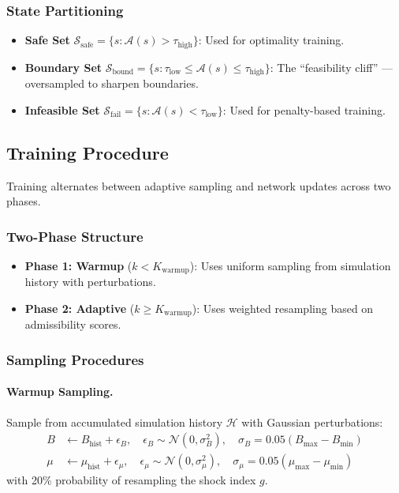 \subsubsection{State Partitioning}
\begin{itemize}
    \item \textbf{Safe Set} $\mathcal{S}_{\text{safe}} = \{s : \mathcal{A}(s) > \tau_{\text{high}}\}$: Used for optimality training.
    \item \textbf{Boundary Set} $\mathcal{S}_{\text{bound}} = \{s : \tau_{\text{low}} \leq \mathcal{A}(s) \leq \tau_{\text{high}}\}$: The ``feasibility cliff'' --- oversampled to sharpen boundaries.
    \item \textbf{Infeasible Set} $\mathcal{S}_{\text{fail}} = \{s : \mathcal{A}(s) < \tau_{\text{low}}\}$: Used for penalty-based training.
\end{itemize}


\subsection{Training Procedure}\label{sec:training}

Training alternates between adaptive sampling and network updates across two phases.

\subsubsection{Two-Phase Structure}
\begin{itemize}
    \item \textbf{Phase 1: Warmup} ($k < K_{\text{warmup}}$): Uses uniform sampling from simulation history with perturbations.
    \item \textbf{Phase 2: Adaptive} ($k \geq K_{\text{warmup}}$): Uses weighted resampling based on admissibility scores.
\end{itemize}

\subsubsection{Sampling Procedures}

\paragraph{Warmup Sampling.}
Sample from accumulated simulation history $\mathcal{H}$ with Gaussian perturbations:
\begin{align}
    B &\leftarrow B_{\text{hist}} + \epsilon_B, \quad \epsilon_B \sim \mathcal{N}(0, \sigma_B^2), \quad \sigma_B = 0.05(B_{\max} - B_{\min}) \\
    \mu &\leftarrow \mu_{\text{hist}} + \epsilon_\mu, \quad \epsilon_\mu \sim \mathcal{N}(0, \sigma_\mu^2), \quad \sigma_\mu = 0.05(\mu_{\max} - \mu_{\min})
\end{align}
with 20\% probability of resampling the shock index $g$.

